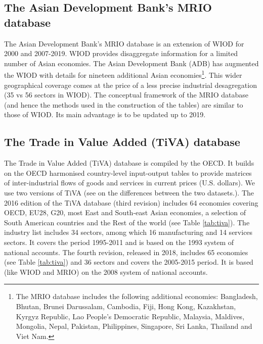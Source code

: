 \documentclass[11pt,a4paper]{paper} %
\begin{document}
\subsection{The Asian Development Bank's MRIO database} 
The Asian Development Bank's MRIO database is an extension of WIOD for 2000 and 2007-2019.
WIOD provides disaggregate information for a limited number of Asian economies. 
The Asian Development Bank (ADB) has augmented the WIOD with details for nineteen additional Asian economies\footnote{The MRIO database includes the following additional economies: Bangladesh, Bhutan, Brunei Darussalam, Cambodia, Fiji, Hong Kong, Kazakhstan, Kyrgyz Republic, Lao People’s Democratic Republic, Malaysia, Maldives, Mongolia, Nepal, Pakistan, Philippines, Singapore, Sri Lanka, Thailand and Viet Nam.}. 
This wider geographical coverage comes at the price of a less precise industrial desagregation (35 vs 56 sectors in WIOD).
The conceptual framework of the MRIO database (and hence the methods used in the construction of the tables) are similar to those of WIOD.
Its main advantage is to be updated up to 2019.  

\subsection{The Trade in Value Added (TiVA) database}
The Trade in Value Added (TiVA) database is compiled by the OECD. 
It builds on the OECD harmonised country-level input-output tables to provide matrices of inter-industrial flows of goods and services in current prices (U.S. dollars).
We use two versions of TiVA (see \cite{OECD2018} on the differences between the two datasets.).
The 2016 edition of the TiVA database (third revision) includes 64 economies covering OECD, EU28, G20, most East and South-east Asian economies, a selection of South American countries and the Rest of the world (see Table \ref{tab:tiva}). The industry list includes 34 sectors, among which 16 manufacturing and 14 services sectors. 
It covers the period 1995-2011 and is based on the 1993 system of national accounts.
The fourth revision, released in 2018, includes 65 economies (see Table \ref{tab:tiva}) and 36 sectors and covers the 2005-2015 period. It is based (like WIOD and MRIO) on the 2008 system of national accounts.
\end{document}
